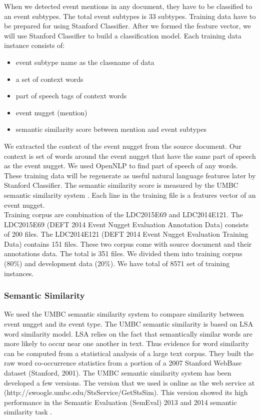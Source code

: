 \documentclass[11pt]{article}
\begin{document}
When we detected event mentions in any document, they have to be classified to an event subtypes. The total event subtypes is 33 subtypes. Training data have to be prepared for using Stanford Classifier. After we formed the feature vector, we will use Stanford Classifier to build a classification model. Each training data instance consists of:
\begin{itemize}
\item event subtype name as the classname of data
\item a set of context words
\item part of speech tags of context words
\item event nugget (mention)
\item semantic similarity score between mention and event subtypes
\end{itemize}
We extracted the context of the event nugget from the source document. Our context is set of words around the event nugget that have the same part of speech as the event nugget. We used OpenNLP \cite{Opennlp} to find part of speech of any words. These training data will be regenerate as useful natural language features later by Stanford Classifier. The semantic similarity score is measured by the UMBC semantic similarity system \cite{Han:13}. Each line in the training file is a features vector of an event nugget.\\
\indent Training corpus are combination of the LDC2015E69 and LDC2014E121. The LDC2015E69 (DEFT 2014 Event Nugget Evaluation Annotation Data) consists of 200 files. The LDC2014E121 (DEFT 2014 Event Nugget Evaluation Training Data) contains 151 files. These two corpus come with source document and their annotations data. The total is 351 files. We divided them into training corpus (80\%) and development data (20\%). We have total of 8571 set of training instances. 

\subsubsection{Semantic Similarity}

\noindent We used the UMBC semantic similarity system to compare similarity between event nugget and its event type. The UMBC semantic similarity \cite{Han:13} is based on LSA word similarity model. LSA relies on the fact that semantically similar words are more likely to occur near one another in text.  Thus evidence for word similarity can be computed from a statistical analysis of a large text corpus.  They built the raw word co-occurrence statistics from a portion of a 2007 Stanford WebBase dataset (Stanford, 2001). The UMBC semantic similarity system has been developed a few versions. The version that we used is online as the web service at (http://swoogle.umbc.edu/StsService/GetStsSim). This version showed its high performance in the Semantic Evaluation (SemEval) 2013 and 2014 semantic similarity task \cite{Han:13,Abhay:14}.
\end{document}
